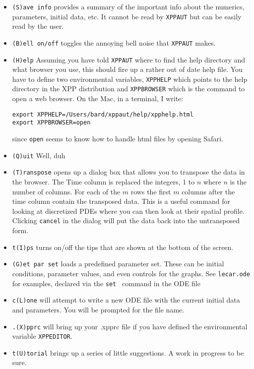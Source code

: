 \documentclass{article}
\begin{document}
\begin{itemize}
\item {\tt (S)ave info}  provides a summary of the important info about the numerics, parameters, initial data, etc.  It cannot be read by {\tt XPPAUT} but can be easily read by the user. 
\item {\tt (B)ell on/off} toggles the annoying bell noise that {\tt XPPAUT} makes.
\item {\tt (H)elp} Assuming you have told {\tt XPPAUT} where to find the help directory and what browser you use, this should fire up a rather out of date help file. You have to define two environmental variables, {\tt XPPHELP} which points to the help directory in the XPP distribution and {\tt XPPBROWSER} which is the command to open a web browser. On the Mac, in a terminal, I write:
\begin{verbatim}
export XPPHELP=/Users/bard/xppaut/help/xpphelp.html
export XPPBROWSER=open
\end{verbatim}
since {\tt open} seems to know how to handle html files by opening Safari.
\item{\tt (Q)uit} Well, duh
\item {\tt (T)ranspose} opens up a dialog box that allows you to transpose the data in the browser. The Time column is replaced the integers, 1 to $n$ where $n$ is the number of columns. For each of the $m$ rows the first $m$ columns after the time column contain the transposed data. This is a useful command for looking at discretized PDEs where you can then look at their spatial profile. Clicking {\tt cancel} in the dialog will put the data back into the untransposed form.
\item {\tt t(I)ps} turns on/off the tips that are shown at the bottom of the screen.
\item {\tt (G)et par set} loads a predefined parameter set. These can be initial conditions, parameter values, and even controls for the graphs. See {\tt lecar.ode} for examples, declared via the {\tt set } command in the ODE file
\item {\tt c(L)one} will attempt to write a new ODE file with the current initial data and parameters. You will be prompted for the file name.
\item {\tt .(X)pprc} will bring up your .xpprc file if you have defined the environmental variable {\tt XPPEDITOR}.
\item {\tt t(U)torial} brings up a series of little suggestions. A work in progress to be sure.
\end{itemize}
\end{document}
